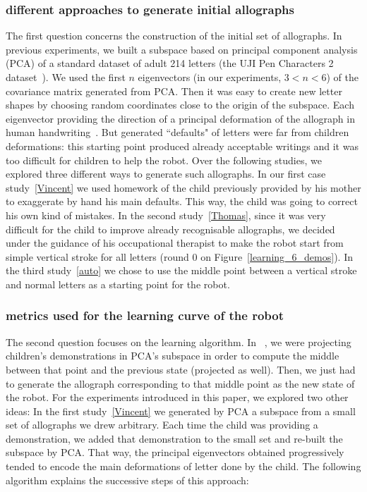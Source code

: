 \documentclass{sig-alternate}
\begin{document}
\subsubsection{different approaches to generate initial allographs}
The first question concerns the construction of the initial set of allographs.
In previous experiments, we built a subspace based on principal component
analysis (PCA) of a standard dataset of adult 214 letters (the UJI Pen Characters 2 dataset~\cite{Llorens2008}).
We used the first $n$ eigenvectors (in
our experiments, $3 < n < 6$) of the covariance matrix
generated from PCA. Then it was easy to create new letter shapes by choosing
random coordinates close to the origin of the subspace. Each eigenvector
providing the direction of a principal deformation of the allograph in human
handwriting~\cite{Hood}. But generated ``defaults" of letters were far from
children deformations: this starting point produced already acceptable writings
and it was too difficult for children to help the robot.
Over the following studies, we explored three different ways to generate such
allographs. In our first case study~\ref{Vincent} we used homework of the child previously provided
by his mother to exaggerate by hand his main defaults. This way, the child was
going to correct his own kind of mistakes. In the second study~\ref{Thomas},
since it was very
difficult for the child to improve already recognisable allographs, we decided under the
guidance of his occupational therapist to make the robot start from simple
vertical stroke for all letters (round 0 on Figure~\ref{learning_6_demos}). In
the third study~\ref{auto} we chose to use the middle point between a vertical stroke
and normal letters as a starting point for the robot. 

\subsubsection{metrics used for the learning curve of the robot}
The second question focuses on the learning algorithm. In
~\cite{Hood}, we were projecting children's demonstrations in PCA's subspace in order to 
compute the middle between that point and the previous state (projected as well). Then, we just had to
generate the allograph corresponding to that middle point as the new state of
the robot. For the experiments introduced in this paper, we explored two other
ideas: In the first study~\ref{Vincent} we generated by PCA a subspace from a
small set of allographs we drew arbitrary. Each time the child was providing a
demonstration, we added that demonstration to the small set and re-built the
subspace by PCA. That way, the principal eigenvectors obtained progressively
tended to encode the main deformations of letter done by the child. The following algorithm explains the successive steps of this approach:
\end{document}
